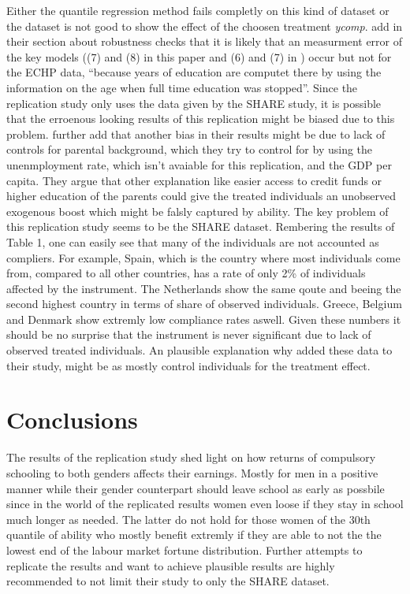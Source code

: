 \documentclass[12pt,a4paper]{article}
\begin{document}
Either the quantile regression method fails completly on this kind of
dataset or the dataset is not good to show the effect of the choosen
treatment \textit{ycomp}. \textcite{brunello} add in their section about
robustness checks that it is likely that an measurment error of the key
models ((7) and (8) in this paper and (6) and (7) in
\textcite{brunello}) occur but not for the ECHP data, \enquote{because
years of education are computet there by using the information on the
age when full time education was stopped}. Since the replication study
only uses the data given by the SHARE study, it is possible that the
erroenous looking results of this replication might be biased due to
this problem. \textcite{brunello} further add that another bias in their
results might be due to lack of controls for parental background, which
they try to control for by using the unenmployment rate, which isn't
avaiable for this replication, and the GDP per capita. They argue that
other explanation like easier access to credit funds or higher education
of the parents could give the treated individuals an unobserved
exogenous boost which might be falsly captured by ability. The key
problem of this replication study seems to be the SHARE dataset.
Rembering the results of Table 1, one can easily see that many of the
individuals are not accounted as compliers. For example, Spain, which is
the country where most individuals come from, compared to all other
countries, has a rate of only 2\% of individuals affected by the
instrument. The Netherlands show the same qoute and beeing the second
highest country in terms of share of observed individuals. Greece,
Belgium and Denmark show extremly low compliance rates aswell. Given
these numbers it should be no surprise that the instrument is never
significant due to lack of observed treated individuals. An plausible
explanation why \textcite{brunello} added these data to their study,
might be as mostly control individuals for the treatment effect.

\section{Conclusions}\label{conclusions}

The results of the replication study shed light on how returns of
compulsory schooling to both genders affects their earnings. Mostly for
men in a positive manner while their gender counterpart should leave
school as early as possbile since in the world of the replicated results
women even loose if they stay in school much longer as needed. The
latter do not hold for those women of the 30th quantile of ability who
mostly benefit extremly if they are able to not the the lowest end of
the labour market fortune distribution. Further attempts to replicate
the results and want to achieve plausible results are highly recommended
to not limit their study to only the SHARE dataset.

\newpage

\printbibliography
\end{document}

